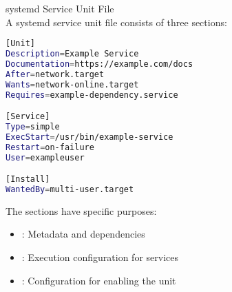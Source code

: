 \begin{code}{systemd Service Unit File}\\
    A systemd service unit file consists of three sections:
    
\begin{lstlisting}[language=bash, style=basesmol]
[Unit]
Description=Example Service
Documentation=https://example.com/docs
After=network.target
Wants=network-online.target
Requires=example-dependency.service

[Service]
Type=simple
ExecStart=/usr/bin/example-service
Restart=on-failure
User=exampleuser

[Install]
WantedBy=multi-user.target
\end{lstlisting}

    The sections have specific purposes:
    \begin{itemize}
        \item [Unit]: Metadata and dependencies
        \item [Service]: Execution configuration for services
        \item [Install]: Configuration for enabling the unit
    \end{itemize}
\end{code}

